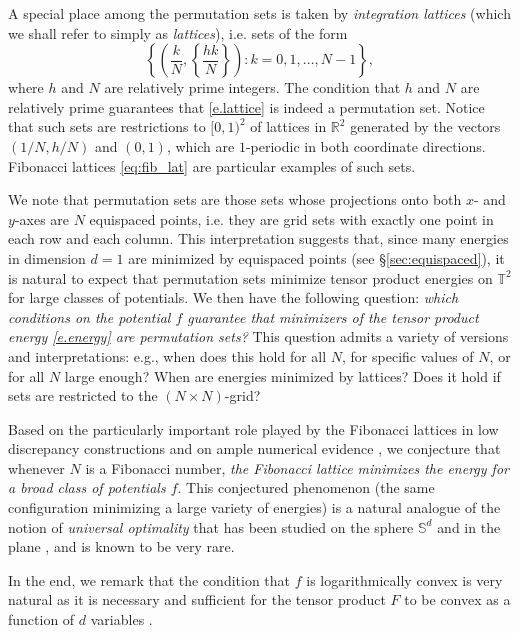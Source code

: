 \documentclass[a4paper,12pt]{article}
\numberwithin{equation}{section}
\theoremstyle{definition}
\begin{document}
A special place among the permutation sets is taken by  {\it integration lattices} (which we shall refer to simply as {\it lattices}), i.e. sets of the form 
\begin{equation}\label{e.lattice}
\left\{\left(\frac{k}{N}, \left\{\frac{hk }{N}\right\}\right): k=0, 1, \dots, N-1\right\},
\end{equation}
where $h$ and $N$ are relatively prime integers. The condition that $h$ and $N$ are relatively prime guarantees that \eqref{e.lattice} is indeed a permutation set. Notice that such sets are restrictions to $[0,1)^2$ of lattices in $\mathbb R^2$ generated by the vectors $(1/N, h/N)$ and $(0,1)$, which are $1$-periodic in both coordinate directions. Fibonacci lattices \eqref{eq:fib_lat} are particular examples of such sets.

We note that permutation sets are those sets whose projections onto both $x$- and $y$-axes are $N$ equispaced points, i.e. they are grid sets with exactly one point in each row and each column.  This interpretation suggests that, since many energies in dimension $d=1$ are minimized by equispaced points (see \S \ref{sec:equispaced}), it is natural to expect that permutation sets minimize tensor product energies on $\mathbb T^2$ for large classes of potentials. We then have the following question: {\emph{which conditions on the potential $f$ guarantee that  minimizers of the tensor product energy \eqref{e.energy} are permutation sets?}} This question admits a variety of versions and interpretations: e.g., when does this hold for all $N$, for specific values of $N$, or for all $N$ large enough? When are energies minimized by lattices? Does it hold if sets are restricted to the $(N\times N)$-grid? 

Based on the  particularly important role played by the Fibonacci lattices in low discrepancy constructions and on ample numerical evidence \cite{HO16}, we conjecture that whenever $N$ is a Fibonacci number,  \emph{the Fibonacci lattice minimizes the energy for a broad class of potentials $f$}. This conjectured phenomenon (the same configuration minimizing a large variety of energies) is a natural analogue of the notion of {\emph{universal optimality}}  that has been studied on the sphere $\mathbb S^d$ \cite{CK07} and in the plane \cite{CKMRV22}, and is known to be very rare. 





In the end, we remark that the condition that $f$ is logarithmically convex is very natural as it is necessary and sufficient for the tensor product $F$ to be convex as a function of $d$ variables \cite{SS12b}. 
\end{document}
